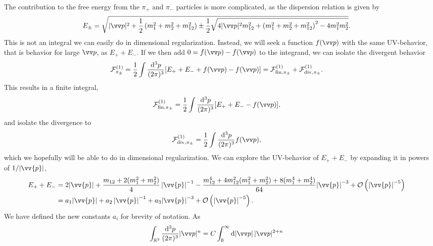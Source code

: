 The contribution to the free energy from the $\pi_+$ and $\pi_-$ particles is more complicated, as the dispersion relation is given by
\begin{equation}
    E_\pm
    = 
    \sqrt{
        |\vv p|^2 +
        \frac{1}{2}
        \left(
            m_1^2 + m_2^2 + m_{12}^2 
        \right)
        \pm 
        \frac{1}{2}
        \sqrt{
            4|\vv p|^2m_{12}^2 
            +
            \left(
                m_1^2 + m_2^2 + m_{12}^2
            \right)^2
            - 4 m_1^2 m_2^2
        }
    }.
\end{equation}
This is not an integral we can easily do in dimensional regularization.
Instead, we will seek a function $f(\vv p)$ with the same UV-behavior, that is behavior for large $\vv p$, as $E_+ + E_-$.
If we then add $0 = f(\vv p) - f(\vv p)$ to the integrand, we can isolate the divergent behavior
\begin{equation}
    \Ef_{\pi_\pm}^{(1)}
    = 
    \frac{1}{2} \int \frac{\dd^3 p}{(2\pi)^3} [E_+ + E_- + f(\vv p) - f(\vv p)]
    = \Ef^{(1)}_{\mathrm{fin}, \pi_\pm } + \Ef^{(1)}_{\mathrm{div}, \pi_\pm}.
\end{equation}
This results in a finite integral, 
\begin{equation}
    \Ef^{(1)}_{\mathrm{fin}, \pi_\pm } = \frac{1}{2} \int \frac{\dd^3 p}{(2\pi)^3} [E_+ + E_- - f(\vv p)],
\end{equation}
and isolate the divergence to
\begin{equation}
    \Ef^{(1)}_{\mathrm{div}, \pi_\pm }
    = 
    \frac{1}{2} \int \frac{\dd^3 p}{(2\pi)^3} f(\vv p),
\end{equation}
which we hopefully will be able to do in dimensional regularization.
We can explore the UV-behavior of $E_+ + E_-$ by expanding it in powers of $1 / \abs{\vv{p}}$,
\begin{align}
    \nonumber
    E_+ + E_-
    & = 
    2  \abs{\vv{p}}
    + \frac{m_{12} + 2(m_1^2 + m_2^2)}{4} \, {\abs{\vv{p}}}^{-1}
    - \frac{m_{12}^4 + 4 m_{12}^2(m_1^2 + m_2^2) + 8(m_1^4 + m_2^4)}{64}
    {\abs{\vv{p}}}^{-3}
    + \Oh[-5]{ \abs{\vv{p}}} 
    \\
    & = 
    a_1  \abs{\vv{p}}
    + a_2 \, {\abs{\vv{p}}}^{-1}
    + a_3
    {\abs{\vv{p}}}^{-3}
    + \Oh[-5]{ \abs{\vv{p}}}.
\end{align}
We have defined the new constants $a_i$ for brevity of notation.
As
\begin{equation}
    \int_{\R^3} \frac{\dd^3 p}{(2 \pi)^3} |\vv p|^{n}
    = C \int_{0}^\infty \dd |\vv p| \, |\vv p|^{2 + n}
\end{equation}
